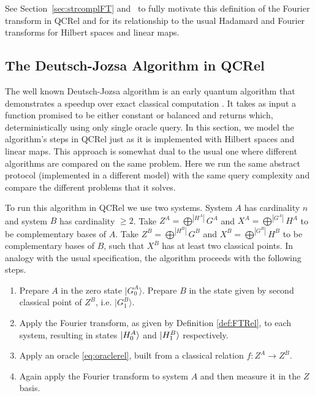 See Section~\ref{sec:strcomplFT} and~\cite{gogioso2015fourier} to fully motivate this definition of the Fourier transform in QCRel and for its relationship to the usual Hadamard and Fourier transforms for Hilbert spaces and linear maps.

\subsection{The Deutsch-Jozsa Algorithm in QCRel}

The well known Deutsch-Jozsa algorithm is an early quantum algorithm that demonstrates a speedup over exact classical computation \cite{DJAlg1992}. It takes as input a function promised to be either constant or balanced and returns which, deterministically using only single oracle query. In this section, we model the algorithm's steps in QCRel just as it is implemented with Hilbert spaces and linear maps. This approach is somewhat dual to the usual one where different algorithms are compared on the same problem. Here we run the same abstract protocol (implemented in a different model) with the same query complexity and compare the different problems that it solves.

To run this algorithm in QCRel we use two systems.  System $A$ has cardinality $n$ and system $B$ has cardinality $\ge 2$. Take $Z^A=\bigoplus^{|H^{A}|}G^A$ and $X^A=\bigoplus^{|G^{A}|}H^A$ to be complementary bases of $A$. Take $Z^B=\bigoplus^{|H^{B}|}G^B$ and $X^B=\bigoplus^{|G^{B}|}H^B$ to be complementary bases of $B$, such that $X^B$ has at least two classical points. In analogy with the usual specification, the algorithm proceeds with the following steps.
\begin{enumerate}
\item Prepare $A$ in the zero state $|G^{A}_0\rangle$. Prepare $B$ in the state given by second classical point of $Z^B$, i.e. $|G^B_1\rangle$.

\item Apply the Fourier transform, as given by Definition \ref{def:FTRel}, to each system, resulting in states $| H_0^A \rangle$ and $| H_1^B \rangle$ respectively.

\item Apply an oracle \eqref{eq:oraclerel}, built from a classical relation $f:Z^A\to Z^B$.

\item Again apply the Fourier transform to system $A$ and then measure it in the $Z$ basis.
\end{enumerate}

